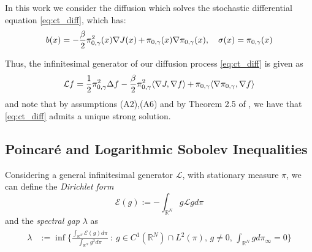 \documentclass[journal,onecolumn]{IEEEtran}
\newcommand{\grad}{\nabla}
\newcommand{\rew}{J}
\newcommand{\reals}{\mathbb{R}}
\newcommand{\dimn}{N}
\newcommand{\gibbs}{\ids_{\infty}}
\newcommand{\gen}{\mathcal{L}}
\newcommand{\ids}{\pi}
\newcommand{\idw}{\gamma}
\newcommand{\isp}{0,\idw}
\newcommand{\dirform}{\mathcal{E}}
\newcommand{\specgap}{\lambda}
\newcommand{\idistrw}{\ids_{\isp}}
\begin{document}
{In this work we consider the diffusion which solves the stochastic differential equation \eqref{eq:ct_diff}, which has:
\[ b(x) = -\frac{\beta}{2} \idistrw^2(x) \grad \rew(x) \,\color{black}{+}\,\idistrw(x) \grad \idistrw(x), \quad \sigma(x) = \idistrw(x)\]

Thus, the infinitesimal generator of our diffusion process \eqref{eq:ct_diff} is given as 
\begin{equation}
\label{eq:diffgen}
    \gen f = \frac{1}{2}\idistrw^2 \Delta f - \frac{\beta}{2} \idistrw^2 \langle \grad \rew , \grad f \rangle  \,\color{black}{+}\, \idistrw \langle \grad \idistrw, \grad f\rangle
\end{equation}
and note that by assumptions (A2),(A6) and by Theorem 2.5 of \cite{karatzas1991brownian}, we have that \eqref{eq:ct_diff} admits a unique strong solution. 
\subsection{Poincar\'e and Logarithmic Sobolev Inequalities}
\label{sec:plsineq}



Considering a general infinitesimal generator $\gen$, with stationary measure $\pi$, we can define the \textit{Dirichlet form}
\[ \dirform(g) := -\int_{\reals^{\dimn}}g\gen g d\pi\]
and the \textit{spectral gap} $\specgap$ as 
\begin{align}
\begin{split}
\label{eq:sgap}
\specgap &:= \inf\bigl\{\frac{\int_{\reals^{\dimn}}\dirform(g) d\pi}{\int_{\reals^{\dimn}}g^2 d\pi} \ : \ g \in C^1(\reals^{\dimn})\cap L^2(\pi),\,g \neq 0,\, \int_{\reals^{\dimn}}gd\gibbs = 0 \bigr\} \\
\end{split}
\end{align}

}
\end{document}
